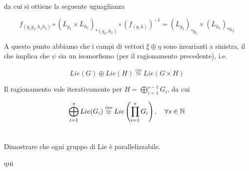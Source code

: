 
da cui si ottiene la seguente uguaglianza

\begin{equation}
	f_{(g_{1} g_{2}, h_{1} h_{2})} \circ (L_{g_{1}} \times L_{h_{1}})_{*(g_{2},h_{2})} \circ (f_{(g,h)})^{-1} = (L_{g_{1}})_{*g_{2}} \times (L_{h_{1}})_{*h_{2}}
\end{equation}

A questo punto abbiamo che i campi di vettori $ \xi \oplus \eta $ sono invarianti a sinistra, il che implica che $ \psi $ sia un isomorfismo (per il ragionamento precedente), i.e.

\begin{equation}
	Lie(G) \oplus Lie(H) \stackrel{iso}{\simeq} Lie(G \times H)
\end{equation}

Il ragionamento vale iterativamente per $ H = \displaystyle\bigoplus_{i=1}^{s-1} G_{i} $, da cui

\begin{equation}
	\bigoplus_{i=1}^{s} Lie(G_{i}) \stackrel{iso}{\simeq} Lie \left( \prod_{i=1}^{s} G_{i} \right) %
	\qcomma \forall s \in \N
\end{equation}

%

\newpage

%

\section{}\label{es3-12}

\begin{tcolorbox}
	Dimostrare che ogni gruppo di Lie è parallelizzabile.
\end{tcolorbox}

qui

